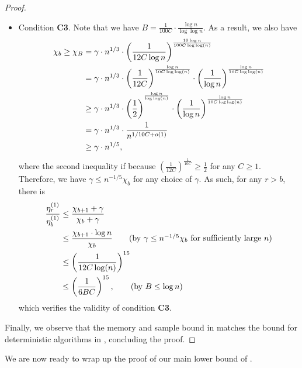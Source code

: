 \begin{proof}
\begin{itemize}
		\item Condition \textbf{C3}. Note that we have $B= \frac{1}{100C}\cdot \frac{\log n}{\log\log n}$. As a result, we also have 
		\begin{equation}
			\label{equ:a-B-lower-bound}
			\begin{aligned}
				\chi_{b}\geq \chi_{B} & = \gamma \cdot n^{1/3} \cdot \left(\frac{1}{12 C\log n}\right)^{\frac{10\log n}{100 C\log\log(n)}}\\
				&= \gamma \cdot n^{1/3} \cdot \left(\frac{1}{12C}\right)^{\frac{\log n}{10C \log\log(n)}} \cdot \left(\frac{1}{\log{n}}\right)^{\frac{\log n}{10C \log\log(n)}}\\
				& \geq \gamma \cdot n^{1/3}\cdot \left(\frac{1}{2}\right)^{^{\frac{\log n}{\log\log(n)}}}\cdot \left(\frac{1}{\log n}\right)^{\frac{\log n}{10C \log\log(n)}}\\
				& = \gamma \cdot n^{1/3}\cdot \frac{1}{n^{1/10C + o(1)}}\\
				& \geq \gamma\cdot n^{1/5},
			\end{aligned}
		\end{equation}
		where the second inequality if because $(\frac{1}{12C})^{\frac{1}{10C}}\geq \frac{1}{2}$ for any $C\geq 1$.
		Therefore, we have $\gamma\leq n^{-1/5}\chi_{b}$ for any choice of $\gamma$. As such, for any $r>b$, there is 
		\begin{align*}
			\frac{\etaib{1}{r}}{\etaib{1}{b}} &\leq \frac{\chi_{b+1}+\gamma}{\chi_{b}+\gamma}\\
			&\leq \frac{\chi_{b+1}\cdot \log n}{\chi_{b}} \tag{by $\gamma\leq n^{-1/5}\chi_{b}$ for sufficiently large $n$}\\
			&\leq \paren{\frac{1}{12 C \log(n)}}^{15} \\
			&\leq \paren{\frac{1}{6 B C}}^{15}, \tag{by $B\leq \log{n}$}
		\end{align*}
		which verifies the validity of condition \textbf{C3}.
	\end{itemize} 
	Finally, we observe that the memory and sample bound in  matches the bound for deterministic algorithms in , concluding the proof. 
\end{proof}

We are now ready to wrap up the proof of our main lower bound of .

